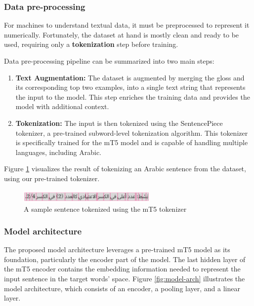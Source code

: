 \documentclass[12.5pt]{article}
\begin{document}
\subsubsection{Data pre-processing}

For machines to understand textual data, it must be preprocessed to represent it numerically. Fortunately, the dataset at hand is mostly clean and ready to be used, requiring only a \textbf{tokenization} step before training.

Data pre-processing pipeline can be summarized into two main steps:

\begin{enumerate}
    \item \textbf{Text Augmentation:} The dataset is augmented by merging the gloss and its corresponding top two examples, into a single text string that represents the input to the model. This step enriches the training data and provides the model with additional context.
    \item \textbf{Tokenization:} The input is then tokenized using the SentencePiece tokenizer, a pre-trained subword-level tokenization algorithm. This tokenizer is specifically trained for the mT5 model and is capable of handling multiple languages, including Arabic.
\end{enumerate}

Figure \ref{fig:tokenized-sentence} visualizes the result of tokenizing an Arabic sentence from the dataset, using our pre-trained tokenizer.

\begin{figure}[H]
    \centering
    \captionsetup{justification=centering}
    \includegraphics[width=0.6\textwidth]{tokenized-sentence.png}
    \caption{A sample sentence tokenized using the mT5 tokenizer}
    \label{fig:tokenized-sentence}
\end{figure}

\subsubsection{Model architecture}

The proposed model architecture leverages a pre-trained mT5 model as its foundation, particularly the encoder part of the model. The last hidden layer of the mT5 encoder contains the embedding information needed to represent the input sentence in the target words’ space. Figure \ref{fig:model-arch} illustrates the model architecture, which consists of an encoder, a pooling layer, and a linear layer.
\end{document}

